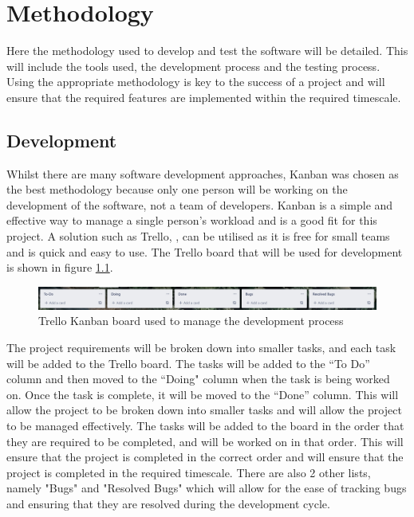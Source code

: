 \chapter{Methodology}
\label{chap:methodology}
Here the methodology used to develop and test the software will be detailed. This will include the tools used, the development process and the testing process. Using the appropriate methodology is key to the success of a project and will ensure that the required features are implemented within the required timescale.
\section{Development}
\label{methodology:development}
Whilst there are many software development approaches, Kanban was chosen as the best methodology because only one person will be working on the development of the software, not a team of developers. Kanban is a simple and effective way to manage a single person’s workload and is a good fit for this project. A solution such as Trello, \cite{trello}, can be utilised as it is free for small teams and is quick and easy to use. The Trello board that will be used for development is shown in figure \ref{fig:kanban-board}.

\begin{figure}[H]
    \centering
    \includegraphics[scale=0.2]{images/trello-board.png}
    \caption{Trello Kanban board used to manage the development process}
    \label{fig:kanban-board}
\end{figure}

The project requirements will be broken down into smaller tasks, and each task will be added to the Trello board. The tasks will be added to the “To Do” column and then moved to the “Doing" column when the task is being worked on. Once the task is complete, it will be moved to the “Done” column. This will allow the project to be broken down into smaller tasks and will allow the project to be managed effectively. The tasks will be added to the board in the order that they are required to be completed, and will be worked on in that order. This will ensure that the project is completed in the correct order and will ensure that the project is completed in the required timescale.
There are also 2 other lists, namely "Bugs" and "Resolved Bugs" which will allow for the ease of tracking bugs and ensuring that they are resolved during the development cycle.

